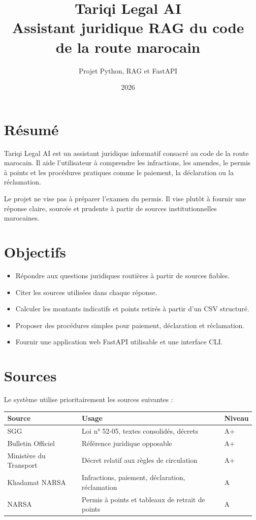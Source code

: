 \documentclass[12pt,a4paper]{article}
\title{\textbf{Tariqi Legal AI}\\
\large Assistant juridique RAG du code de la route marocain}
\author{Projet Python, RAG et FastAPI}
\date{2026}
\begin{document}
\maketitle
\tableofcontents
\newpage

\section{Résumé}

Tariqi Legal AI est un assistant juridique informatif consacré au code de la route marocain.
Il aide l'utilisateur à comprendre les infractions, les amendes, le permis à points et les
procédures pratiques comme le paiement, la déclaration ou la réclamation.

Le projet ne vise pas à préparer l'examen du permis. Il vise plutôt à fournir une réponse
claire, sourcée et prudente à partir de sources institutionnelles marocaines.

\section{Objectifs}

\begin{itemize}[leftmargin=1.2cm]
    \item Répondre aux questions juridiques routières à partir de sources fiables.
    \item Citer les sources utilisées dans chaque réponse.
    \item Calculer les montants indicatifs et points retirés à partir d'un CSV structuré.
    \item Proposer des procédures simples pour paiement, déclaration et réclamation.
    \item Fournir une application web FastAPI utilisable et une interface CLI.
\end{itemize}

\section{Sources}

Le système utilise prioritairement les sources suivantes :

\begin{longtable}{p{4cm} p{8cm} p{2cm}}
\toprule
\textbf{Source} & \textbf{Usage} & \textbf{Niveau} \\
\midrule
\endhead
SGG & Loi n° 52-05, textes consolidés, décrets & A+ \\
Bulletin Officiel & Référence juridique opposable & A+ \\
Ministère du Transport & Décret relatif aux règles de circulation & A+ \\
Khadamat NARSA & Infractions, paiement, déclaration, réclamation & A \\
NARSA & Permis à points et tableaux de retrait de points & A \\
\bottomrule
\end{longtable}
\end{document}
